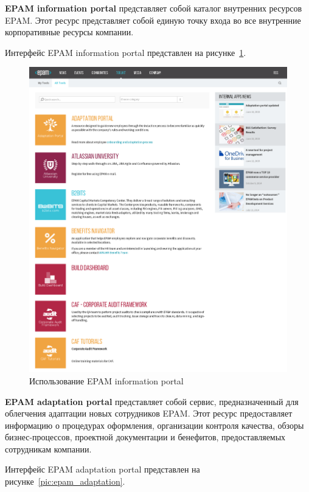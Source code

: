 \newpage

\textbf{EPAM information portal} представляет собой каталог внутренних ресурсов EPAM.
Этот ресурс представляет собой единую точку входа во все внутренние корпоративные ресурсы
компании.

Интерфейс EPAM information portal представлен на рисунке~\ref{pic:epam_info}.

\begin{figure}[h!]
  \centering
  \includegraphics[width=150mm]{pic/epam_info.png}
  \caption{Использование EPAM information portal}
  \label{pic:epam_info}
\end{figure}

\newpage

\textbf{EPAM adaptation portal} представляет собой сервис, предназначенный для
облегчения адаптации новых сотрудников EPAM. 
Этот ресурс предоставляет информацию о процедурах оформления, 
организации контроля качества, обзоры бизнес-процессов,
проектной документации и бенефитов, предоставляемых сотрудникам компании.

Интерфейс EPAM adaptation portal представлен на рисунке~\ref{pic:epam_adaptation}.

